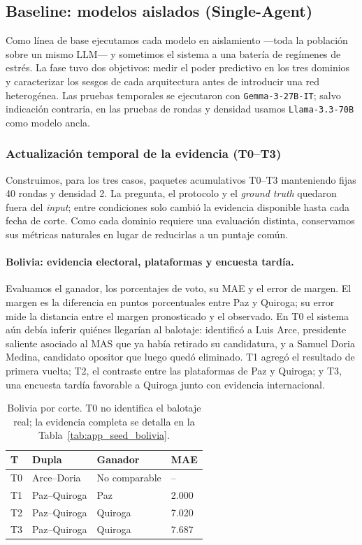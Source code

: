 \documentclass[11pt]{article}
\begin{document}
\subsection{Baseline: modelos aislados (Single-Agent)}
\label{subsec:baseline}

Como línea de base ejecutamos cada modelo en aislamiento —toda la población sobre un mismo LLM— y sometimos el sistema a una batería de regímenes de estrés. La fase tuvo dos objetivos: medir el poder predictivo en los tres dominios y caracterizar los sesgos de cada arquitectura antes de introducir una red heterogénea. Las pruebas temporales se ejecutaron con \texttt{Gemma-3-27B-IT}; salvo indicación contraria, en las pruebas de rondas y densidad usamos \texttt{Llama-3.3-70B} como modelo ancla.

\subsubsection{Actualización temporal de la evidencia (T0--T3)}

Construimos, para los tres casos, paquetes acumulativos T0--T3 manteniendo fijas 40 rondas y densidad 2. La pregunta, el protocolo y el \textit{ground truth} quedaron fuera del \textit{input}; entre condiciones solo cambió la evidencia disponible hasta cada fecha de corte. Como cada dominio requiere una evaluación distinta, conservamos sus métricas naturales en lugar de reducirlas a un puntaje común.

\paragraph{Bolivia: evidencia electoral, plataformas y encuesta tardía.}
Evaluamos el ganador, los porcentajes de voto, su MAE y el error de margen. El margen es la diferencia en puntos porcentuales entre Paz y Quiroga; su error mide la distancia entre el margen pronosticado y el observado. En T0 el sistema aún debía inferir quiénes llegarían al balotaje: identificó a Luis Arce, presidente saliente asociado al MAS que ya había retirado su candidatura, y a Samuel Doria Medina, candidato opositor que luego quedó eliminado. T1 agregó el resultado de primera vuelta; T2, el contraste entre las plataformas de Paz y Quiroga; y T3, una encuesta tardía favorable a Quiroga junto con evidencia internacional.

\begin{table}[H]
\centering
\small
\begin{tabular}{@{}llll@{}}
\toprule
\textbf{T} & \textbf{Dupla} & \textbf{Ganador} & \textbf{MAE} \\
\midrule
T0 & Arce--Doria & No comparable & -- \\
T1 & Paz--Quiroga & Paz & 2.000 \\
T2 & Paz--Quiroga & Quiroga & 7.020 \\
T3 & Paz--Quiroga & Quiroga & 7.687 \\
\bottomrule
\end{tabular}
\caption{Bolivia por corte. T0 no identifica el balotaje real; la evidencia completa se detalla en la Tabla~\ref{tab:app_seed_bolivia}.}
\label{tab:seed_bolivia}
\end{table}
\end{document}
